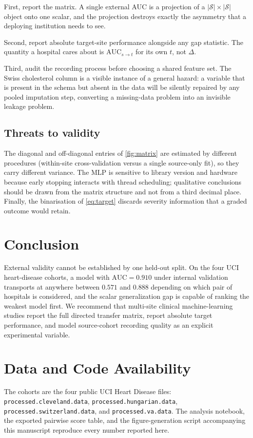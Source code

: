 \documentclass[manuscript,nonacm]{acmart}
\begin{document}
First, report the matrix. A single external AUC is a projection of a
$|\mathcal{S}|\times|\mathcal{S}|$ object onto one scalar, and the projection destroys
exactly the asymmetry that a deploying institution needs to see.

Second, report absolute target-site performance alongside any gap statistic. The
quantity a hospital cares about is $\mathrm{AUC}_{s\rightarrow t}$ for its own $t$, not
$\Delta$.

Third, audit the recording process before choosing a shared feature set. The Swiss
cholesterol column is a visible instance of a general hazard: a variable that is present
in the schema but absent in the data will be silently repaired by any pooled imputation
step, converting a missing-data problem into an invisible leakage problem.

\subsection{Threats to validity}
The diagonal and off-diagonal entries of \cref{fig:matrix} are estimated by different
procedures (within-site cross-validation versus a single source-only fit), so they carry
different variance. The MLP is sensitive to library version and hardware because early
stopping interacts with thread scheduling; qualitative conclusions should be drawn from
the matrix structure and not from a third decimal place. Finally, the binarisation of
\cref{eq:target} discards severity information that a graded outcome would retain.

\section{Conclusion}
External validity cannot be established by one held-out split. On the four UCI
heart-disease cohorts, a model with
$\mathrm{AUC}=0.910$ under internal validation transports at anywhere between $0.571$
and $0.888$ depending on which pair of hospitals is considered, and the scalar
generalization gap is capable of ranking the weakest model first. We recommend that
multi-site clinical machine-learning studies report the full directed transfer matrix,
report absolute target performance, and model source-cohort recording quality as an
explicit experimental variable.

\section*{Data and Code Availability}
The cohorts are the four public UCI Heart Disease files: \texttt{processed.cleveland.data},
\texttt{processed.hungarian.data}, \texttt{processed.switzerland.data}, and
\texttt{processed.va.data}. The analysis notebook,
the exported pairwise score table, and the figure-generation script accompanying this
manuscript reproduce every number reported here.
\end{document}
